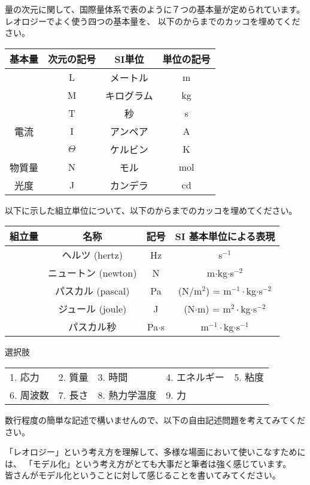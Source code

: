 \documentclass[uplatex,dvipdfmx,a4paper,11pt]{jsarticle}
\begin{document}
\begin{qlist}
  \qitem 量の次元に関して、国際量体系で表のように７つの基本量が定められています。レオロジーでよく使う四つの基本量を、
  以下のからまでのカッコを埋めてください。
	\begin{center}
		\begin{tabular}{|c|c||c|c|} \hline
			基本量 		& 次元の記号 & SI単位 		& 単位の記号\\ \hline \hline
			\qbox{}		& L			& メートル 		& m \\ \hline
			\qbox{}		& M			& キログラム 	& kg \\ \hline
			\qbox{}		& T			& 秒 			& s \\ \hline
			電流		& I			& アンペア 		& A \\ \hline
			\qbox{}	& $\Theta$	& ケルビン 		& K \\ \hline
			物質量		& N			& モル 			& mol \\ \hline
			光度		& J			& カンデラ 		& cd \\ \hline
		\end{tabular}
	\end{center}

	\qitem 以下に示した組立単位について、以下のからまでのカッコを埋めてください。
	\begin{center}
		\begin{tabular}{|c|c||c|c|} \hline
			組立量 		& 名称					& 記号		& SI 基本単位による表現 	\\ \hline \hline
			\qbox{}		& ヘルツ (hertz)		& Hz		&  s$^{-1}$ 					\\ \hline
			\qbox{}		& ニュートン (newton)	& N 		& m$\cdot$kg$\cdot$s$^{-2}$ 	\\ \hline
			\qbox{}		& パスカル (pascal)		& Pa 		& (N/m$^2$) = m$^{-1}\cdot$kg$\cdot$s$^{-2}$ \\ \hline
			\qbox{}	& ジュール (joule)		& J 		& (N$\cdot$m) = m$^{2}\cdot$kg$\cdot$s$^{-2}$ \\ \hline
			\qbox{}		& パスカル秒			& Pa$\cdot$s & m$^{-1}\cdot$kg$\cdot$s$^{-1}$ \\ \hline
		\end{tabular}
  \end{center}
  
  \begin{itembox}[l]{選択肢}
    \begin{center}
      \begin{tabular}{lllll}
        1. 応力&2. 質量&3. 時間&4. エネルギー&5. 粘度\\
        6. 周波数&7. 長さ&8. 熱力学温度&9. 力
      \end{tabular}
    \end{center}
  \end{itembox}
\end{qlist}

数行程度の簡単な記述で構いませんので、以下の自由記述問題を考えてみてください。
\begin{qlist}
\qitem 「レオロジー」という考え方を理解して、多様な場面において使いこなすためには、
「モデル化」という考え方がとても大事だと筆者は強く感じています。\\
皆さんがモデル化ということに対して感じることを書いてみてください。
\end{qlist}
\end{document}
